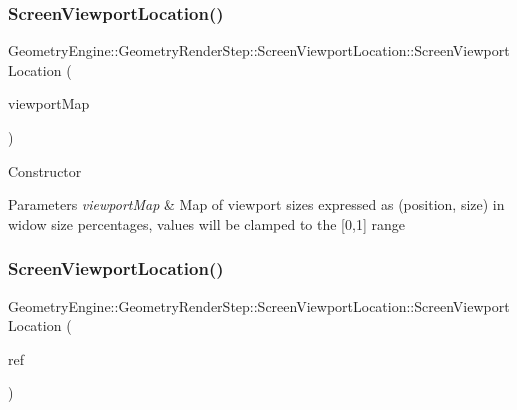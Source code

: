 \subsubsection{\texorpdfstring{ScreenViewportLocation()}{ScreenViewportLocation()}\hspace{0.1cm}{\footnotesize\ttfamily [2/3]}}
{\footnotesize\ttfamily Geometry\+Engine\+::\+Geometry\+Render\+Step\+::\+Screen\+Viewport\+Location\+::\+Screen\+Viewport\+Location (\begin{DoxyParamCaption}\item[{const std\+::map$<$ \mbox{\hyperlink{namespace_geometry_engine_1_1_geometry_world_item_1_1_geometry_camera_a3766848bae97ff8203fa26907ac359ef}{Geometry\+World\+Item\+::\+Geometry\+Camera\+::\+Camera\+Targets}}, Q\+Vector4D $>$ \&}]{viewport\+Map }\end{DoxyParamCaption})}

Constructor 
\begin{DoxyParams}{Parameters}
{\em viewport\+Map} & Map of viewport sizes expressed as (position, size) in widow size percentages, values will be clamped to the \mbox{[}0,1\mbox{]} range \\
\hline
\end{DoxyParams}
\mbox{\label{class_geometry_engine_1_1_geometry_render_step_1_1_screen_viewport_location_a48164f2c04f800d345b9193c5f0f35da}} 
\subsubsection{\texorpdfstring{ScreenViewportLocation()}{ScreenViewportLocation()}\hspace{0.1cm}{\footnotesize\ttfamily [3/3]}}
{\footnotesize\ttfamily Geometry\+Engine\+::\+Geometry\+Render\+Step\+::\+Screen\+Viewport\+Location\+::\+Screen\+Viewport\+Location (\begin{DoxyParamCaption}\item[{const \mbox{\hyperlink{class_geometry_engine_1_1_geometry_render_step_1_1_screen_viewport_location}{Screen\+Viewport\+Location}} \&}]{ref }\end{DoxyParamCaption})\hspace{0.3cm}{\ttfamily [inline]}}

